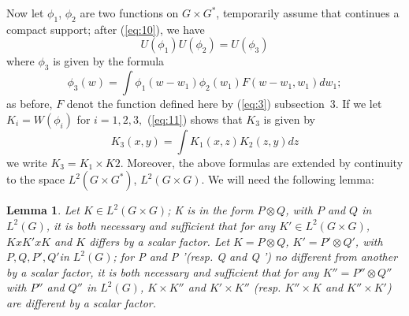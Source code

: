 \documentclass[12pt]{amsart}
\newtheorem{lemma}{Lemma}
\newcounter{ssection}
\renewcommand{\subsection}{
  \addtocounter{ssection}{1}{\bf  \arabic{ssection}.\  }}
\begin{document}
\subsection{}
Now let $\phi_1$, $\phi_2$ are two functions on $G\times G^*$, 	
temporarily assume that continues a compact support; after (\ref{eq:10}),
we have
\[
U(\phi_1)U(\phi_2) = U(\phi_3)
\]
where $\phi_3$ is given by the formula 
\begin{equation}\label{eq:13}
\phi_3(w) = \int \phi_1(w-w_1)\phi_2(w_1)F(w-w_1,w_1) dw_1;
\end{equation}
as before, $F$ denot the function defined here by (\ref{eq:3}) subsection~3.
If we let $K_i=W(\phi_i)$ for $i = 1, 2, 3,$ (\ref{eq:11}) shows that $K_3$
 is given by
\begin{equation}\label{eq:14}
K_3(x,y)=\int K_1(x,z)K_2(z,y)dz
\end{equation}
we write $K_3 = K_1\times K 2$.
Moreover, the above formulas are extended by continuity 
to the space $L^2(G\times G^*)$, $L^2 (G\times G)$.
We will need the following lemma:
\begin{lemma}\label{l:2}
Let $K\in L^2(G\times G)$; K is in the form $P\otimes Q$, 
with $P$ and $Q$ in $L^2(G)$, 
it is both necessary and sufficient that for any $K'\in L^2(G\times G)$,
$K x K' x K$ and $K$ differs by a scalar factor.
Let $K = P\otimes Q$, $K'= P'\otimes Q'$, with $P, Q, P', Q '$in $L^2(G)$;
for P and P '(resp. Q and Q ') 	
no different from another by a scalar factor, 
it is both necessary and sufficient that for any
$K''=P''\otimes Q''$ with $P''$ and $Q''$ in $L^2(G)$, $K\times K''$
 and $K'\times K''$ (resp. $K''\times K$ and $K''\times K'$) 
are different by a scalar factor.
\end{lemma}
	 	
\end{document}
